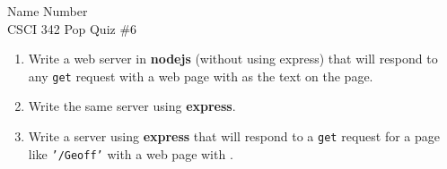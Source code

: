 \documentclass{article}
\begin{document}
Name \hrulefill Number \hrulefill\\
CSCI 342 Pop Quiz \#6

\begin{enumerate}
\item Write a web server in {\bf nodejs} (without using express) that
  will respond to any {\tt get}
  request with a web page with 
  as the text on the page.

  \vfill

\item Write the same server using {\bf express}.

  \vfill

\item Write a server using {\bf express} that will respond to
  a {\tt get} request for a page like {\tt '/Geoff'}
  with a web page with .

  \vfill

\end{enumerate}
\end{document}
